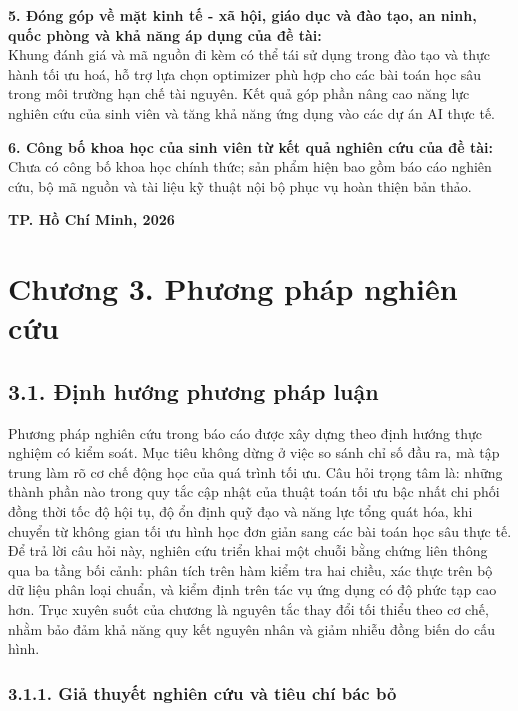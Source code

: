 \documentclass[a4paper,12pt]{article}
\newcommand{\ReportDate}{TP. Hồ Chí Minh, 2026}
\begin{document}
\begin{titlepage}
\vspace{0.45cm}
\noindent\textbf{5. Đóng góp về mặt kinh tế - xã hội, giáo dục và đào tạo, an ninh, quốc phòng và khả năng áp dụng của đề tài:}\\
Khung đánh giá và mã nguồn đi kèm có thể tái sử dụng trong đào tạo và thực hành tối ưu hoá, hỗ trợ lựa chọn optimizer phù hợp cho các bài toán học sâu trong môi trường hạn chế tài nguyên. Kết quả góp phần nâng cao năng lực nghiên cứu của sinh viên và tăng khả năng ứng dụng vào các dự án AI thực tế.

\vspace{0.45cm}
\noindent\textbf{6. Công bố khoa học của sinh viên từ kết quả nghiên cứu của đề tài:}\\
Chưa có công bố khoa học chính thức; sản phẩm hiện bao gồm báo cáo nghiên cứu, bộ mã nguồn và tài liệu kỹ thuật nội bộ phục vụ hoàn thiện bản thảo.

\vfill
\begin{center}
{\large \textbf{\ReportDate}}
\end{center}
\end{titlepage}

\section{Chương 3. Phương pháp nghiên cứu}

\subsection{3.1. Định hướng phương pháp luận }

Phương pháp nghiên cứu trong báo cáo được xây dựng theo định hướng thực nghiệm có kiểm soát. Mục tiêu không dừng ở việc so sánh chỉ số đầu ra, mà tập trung làm rõ cơ chế động học của quá trình tối ưu. Câu hỏi trọng tâm là: những thành phần nào trong quy tắc cập nhật của thuật toán tối ưu bậc nhất chi phối đồng thời tốc độ hội tụ, độ ổn định quỹ đạo và năng lực tổng quát hóa, khi chuyển từ không gian tối ưu hình học đơn giản sang các bài toán học sâu thực tế. Để trả lời câu hỏi này, nghiên cứu triển khai một chuỗi bằng chứng liên thông qua ba tầng bối cảnh: phân tích trên hàm kiểm tra hai chiều, xác thực trên bộ dữ liệu phân loại chuẩn, và kiểm định trên tác vụ ứng dụng có độ phức tạp cao hơn. Trục xuyên suốt của chương là nguyên tắc thay đổi tối thiểu theo cơ chế, nhằm bảo đảm khả năng quy kết nguyên nhân và giảm nhiễu đồng biến do cấu hình.

\subsubsection{3.1.1. Giả thuyết nghiên cứu và tiêu chí bác bỏ}
\end{document}
